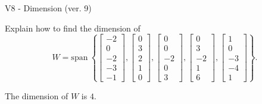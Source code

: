 \begin{exercise}
  \begin{exerciseTitle}V8 - Dimension (ver. 9)\end{exerciseTitle}
  \begin{exerciseStatement}
    Explain how to find the dimension of 
\[W=\mathrm{span}\ \left\{\left[\begin{array}{r}
-2 \\
0 \\
-2 \\
-3 \\
-1
\end{array}\right] , \left[\begin{array}{r}
0 \\
3 \\
2 \\
1 \\
0
\end{array}\right] , \left[\begin{array}{r}
0 \\
0 \\
-2 \\
0 \\
3
\end{array}\right] , \left[\begin{array}{r}
0 \\
3 \\
-2 \\
1 \\
6
\end{array}\right] , \left[\begin{array}{r}
1 \\
0 \\
-3 \\
-4 \\
1
\end{array}\right]\right\}.\]



  \end{exerciseStatement}
  \begin{exerciseAnswer}
   The dimension of \(W\) is  \(4\).
  


  \end{exerciseAnswer}
\end{exercise}